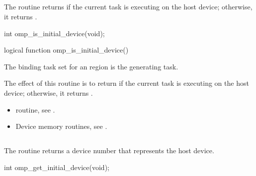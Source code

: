 \subsection{}
\label{subsec:omp_is_initial_device}
\summary
The  routine returns  if the current 
task is executing on the host device; otherwise, it returns .

\begin{samepage}
\format
\begin{ccppspecific}
\begin{ompcFunction}
int omp_is_initial_device(void);
\end{ompcFunction}
\end{ccppspecific}
\end{samepage}

\begin{fortranspecific}
\begin{ompfFunction}
logical function omp_is_initial_device()
\end{ompfFunction}
\end{fortranspecific}

\binding
The binding task set for an  region is 
the generating task.

\effect
The effect of this routine is to return  if the current 
task is executing on the host device; otherwise, it returns .

\crossreferences
\begin{itemize}


\item {} routine, see
.

\item Device memory routines, see .
\end{itemize}



\subsection{}
\label{subsec:omp_get_initial_device}
\summary
The  routine returns a device number 
that represents the host device.

\begin{samepage}
\format
\begin{ccppspecific}
\begin{ompcFunction}
int omp_get_initial_device(void);
\end{ompcFunction}
\end{ccppspecific}
\end{samepage}

